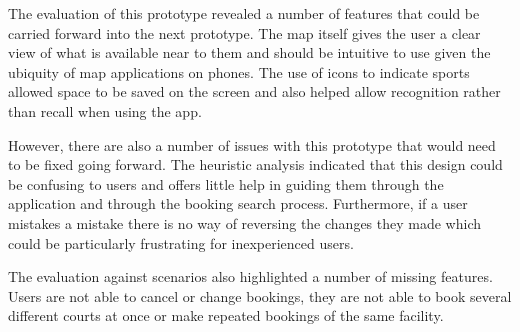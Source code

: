 The evaluation of this prototype revealed a number of features that could be
carried forward into the next prototype. The map itself gives the user a clear
view of what is available near to them and should be intuitive to use given the
ubiquity of map applications on phones. The use of icons to indicate sports
allowed space to be saved on the screen and also helped allow recognition
rather than recall when using the app.

However, there are also a number of issues with this prototype that would need
to be fixed going forward. The heuristic analysis indicated that this design
could be confusing to users and offers little help in guiding them through the
application and through the booking search process. Furthermore, if a user
mistakes a mistake there is no way of reversing the changes they made which
could be particularly frustrating for inexperienced users.

The evaluation against scenarios also highlighted a number of missing features.
Users are not able to cancel or change bookings, they are not able to book
several different courts at once or make repeated bookings of the same
facility.

\restoregeometry%

